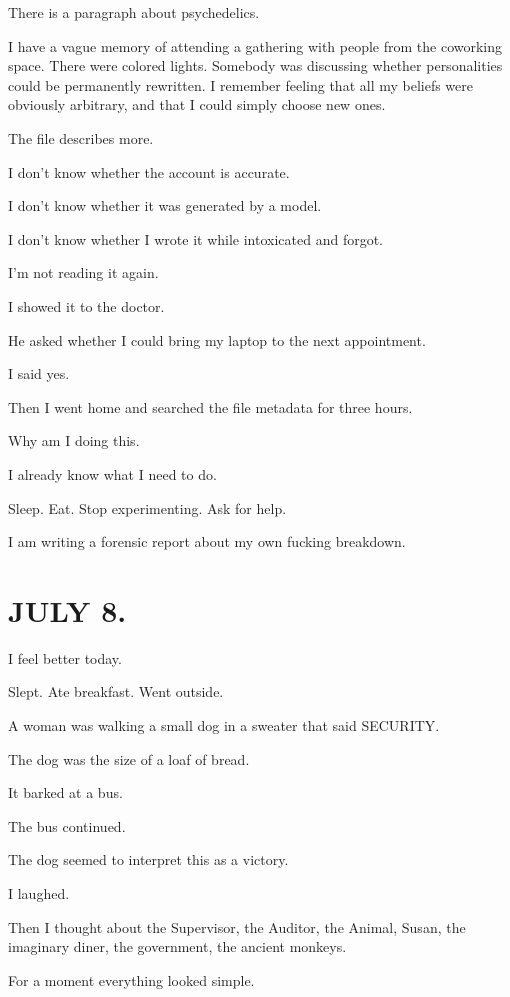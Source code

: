 \documentclass[11pt,oneside]{book}
\begin{document}
There is a paragraph about psychedelics.

I have a vague memory of attending a gathering with people from the coworking space. There were colored lights. Somebody was discussing whether personalities could be permanently rewritten. I remember feeling that all my beliefs were obviously arbitrary, and that I could simply choose new ones.

The file describes more.

I don't know whether the account is accurate.

I don't know whether it was generated by a model.

I don't know whether I wrote it while intoxicated and forgot.

I'm not reading it again.

I showed it to the doctor.

He asked whether I could bring my laptop to the next appointment.

I said yes.

Then I went home and searched the file metadata for three hours.

Why am I doing this.

I already know what I need to do.

Sleep. Eat. Stop experimenting. Ask for help.

I am writing a forensic report about my own fucking breakdown.

\section*{JULY 8.}

I feel better today.

Slept. Ate breakfast. Went outside.

A woman was walking a small dog in a sweater that said SECURITY.

The dog was the size of a loaf of bread.

It barked at a bus.

The bus continued.

The dog seemed to interpret this as a victory.

I laughed.

Then I thought about the Supervisor, the Auditor, the Animal, Susan, the imaginary diner, the government, the ancient monkeys.

For a moment everything looked simple.
\end{document}
